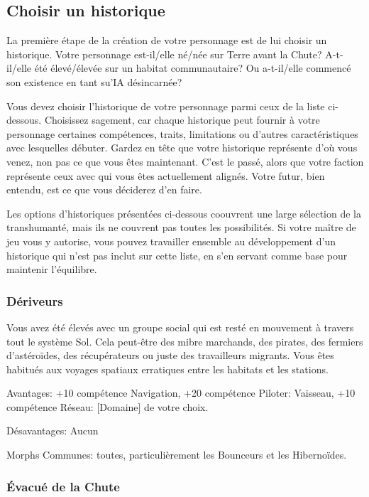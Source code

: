 \subsection{Choisir un historique} \label{choose-background} 

La première étape de la création de votre personnage est de lui choisir un historique. Votre personnage est-il/elle né/née sur Terre avant la Chute? A-t-il/elle été élevé/élevée sur un habitat communautaire? Ou a-t-il/elle commencé son existence en tant su'IA désincarnée? 

Vous devez choisir l'historique de votre personnage parmi ceux de la liste ci-dessous. Choisissez sagement, car chaque historique peut fournir à votre personnage certaines compétences, traits, limitations ou d'autres caractéristiques avec lesquelles débuter. Gardez en tête que votre historique représente d'où vous venez, non pas ce que vous êtes maintenant. C'est le passé, alors que votre faction représente ceux avec qui vous êtes actuellement alignés. Votre futur, bien entendu, est ce que vous déciderez d'en faire. 

Les options d'historiques présentées ci-dessous coouvrent une large sélection de la transhumanté, mais ils ne couvrent pas toutes les possibilités. Si votre maître de jeu vous y autorise, vous pouvez travailler ensemble au développement d'un historique qui n'est pas inclut sur cette liste, en s'en servant comme base pour maintenir l'équilibre. 

\subsubsection{Dériveurs} \label{sec:drifters} 

Vous avez été élevés avec un groupe social qui est resté en mouvement à travers tout le système Sol. Cela peut-être des mibre marchands, des pirates, des fermiers d'astéroïdes, des récupérateurs ou juste des travailleurs migrants. Vous êtes habitués aux voyages spatiaux erratiques entre les habitats et les stations. 

Avantages: +10 compétence Navigation, +20 compétence Piloter: Vaisseau, +10 compétence Réseau: [Domaine] de votre choix. 

Désavantages: Aucun 

Morphs Communes: toutes, particulièrement les Bounceurs et les Hibernoïdes. 

\subsubsection{Évacué de la Chute} \label{sec:fall-evacuee} 


